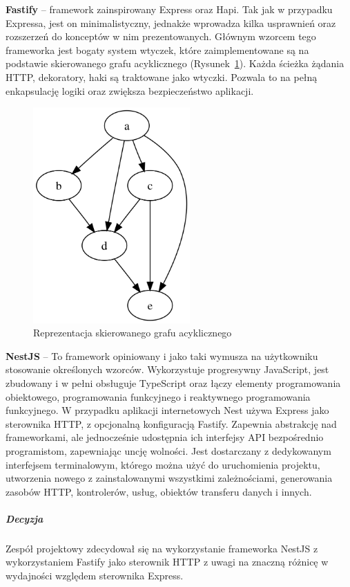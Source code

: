 \documentclass[12pt, a4paper, twoside, openany]{book}
\begin{document}
\textbf{Fastify} -- framework zainspirowany Express oraz Hapi. Tak jak w przypadku Expressa,
jest on minimalistyczny, jednakże wprowadza kilka usprawnień oraz rozszerzeń do
konceptów w nim prezentowanych. Głównym wzorcem tego frameworka jest bogaty system
wtyczek, które zaimplementowane są na podstawie skierowanego grafu acyklicznego (Rysunek~\ref{fig:ADG}).
Każda ścieżka żądania HTTP, dekoratory, haki są traktowane jako wtyczki.
Pozwala to na pełną enkapsulację logiki oraz zwiększa bezpieczeństwo aplikacji.

\begin{figure}[h]
    \includegraphics[width=6cm]{../ADG.png}
    \centering
    \caption{Reprezentacja skierowanego grafu acyklicznego}
    \label{fig:ADG}
\end{figure}

\textbf{NestJS} -- To framework opiniowany i jako taki wymusza na użytkowniku stosowanie określonych wzorców.
Wykorzystuje progresywny JavaScript, jest zbudowany i w pełni obsługuje TypeScript oraz łączy elementy
programowania obiektowego, programowania funkcyjnego i reaktywnego programowania funkcyjnego.
W przypadku aplikacji internetowych Nest używa Express jako sterownika HTTP,
z opcjonalną konfiguracją Fastify. Zapewnia abstrakcję nad frameworkami,
ale jednocześnie udostępnia ich interfejsy API bezpośrednio programistom, zapewniając uncję wolności.
Jest dostarczany z dedykowanym interfejsem terminalowym, którego można użyć do uruchomienia projektu,
utworzenia nowego z zainstalowanymi wszystkimi zależnościami, generowania zasobów HTTP,
kontrolerów, usług, obiektów transferu danych i innych.

\subparagraph{Decyzja\\}

Zespół projektowy zdecydował się na wykorzystanie frameworka NestJS z wykorzystaniem
Fastify jako sterownik HTTP z uwagi na znaczną różnicę w wydajności względem sterownika Express.
\end{document}
